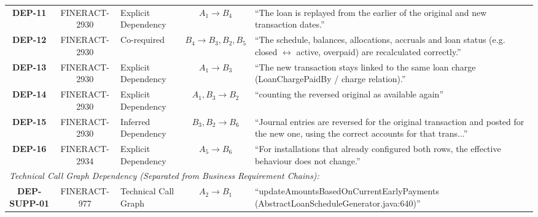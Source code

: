 \begin{table}[t]
\begin{tabularx}{\textwidth}{c c l c X}
\textbf{DEP-11} & FINERACT-2930 & Explicit Dependency & $A_1 \rightarrow B_4$ & ``The loan is replayed from the earlier of the original and new transaction dates.'' \\
\textbf{DEP-12} & FINERACT-2930 & Co-required & $B_4 \rightarrow B_3, B_2, B_5$ & ``The schedule, balances, allocations, accruals and loan status (e.g. closed $\leftrightarrow$ active, overpaid) are recalculated correctly.'' \\
\textbf{DEP-13} & FINERACT-2930 & Explicit Dependency & $A_1 \rightarrow B_3$ & ``The new transaction stays linked to the same loan charge (LoanChargePaidBy / charge relation).'' \\
\textbf{DEP-14} & FINERACT-2930 & Explicit Dependency & $A_1, B_3 \rightarrow B_2$ & ``counting the reversed original as available again'' \\
\textbf{DEP-15} & FINERACT-2930 & Inferred Dependency & $B_3, B_2 \rightarrow B_6$ & ``Journal entries are reversed for the original transaction and posted for the new one, using the correct accounts for that trans...'' \\
\textbf{DEP-16} & FINERACT-2934 & Explicit Dependency & $A_5 \rightarrow B_6$ & ``For installations that already configured both rows, the effective behaviour does not change.'' \\
\midrule
\multicolumn{5}{l}{\textit{Technical Call Graph Dependency (Separated from Business Requirement Chains):}} \\
\textbf{DEP-SUPP-01} & FINERACT-977 & Technical Call Graph & $A_2 \rightarrow B_1$ & ``updateAmountsBasedOnCurrentEarlyPayments (AbstractLoanScheduleGenerator.java:640)'' \\
\bottomrule
\end{tabularx}
\end{table}
